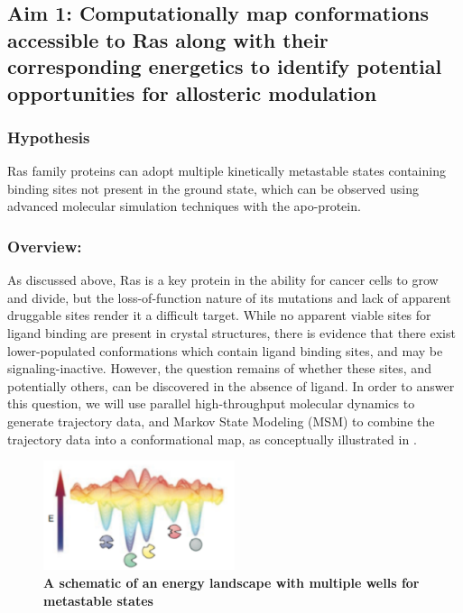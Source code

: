 \documentclass[12pt]{article}
\begin{document}
  \subsection*{Aim 1: Computationally map conformations accessible to Ras along with their corresponding energetics to identify potential opportunities for allosteric modulation}
  
  \subsubsection*{Hypothesis}
  Ras family proteins can adopt multiple kinetically metastable states containing binding sites not present in the ground state, which can be observed using advanced molecular simulation techniques with the apo-protein.
  \subsubsection*{Overview:}
  As discussed above, Ras is a key protein in the ability for cancer cells to grow and divide, but the loss-of-function nature of its mutations and lack of apparent druggable sites render it a difficult target. While no apparent viable sites for ligand binding are present in crystal structures, there is evidence that there exist lower-populated conformations \cite{fesik} \cite{ostrem2013} which contain ligand binding sites, and may be signaling-inactive. However, the question remains of whether these sites, and potentially others, can be discovered in the absence of ligand. In order to answer this question, we will use parallel high-throughput molecular dynamics to generate trajectory data, and Markov State Modeling (MSM) \cite{chodera2014} to combine the trajectory data into a conformational map, as conceptually illustrated in .
  
    \begin{figure}[H]
  \centering
  \includegraphics[width=0.5\textwidth]{craik.png}
  \caption{\textbf{A schematic of an energy landscape with multiple wells for metastable states} \cite{craik}}
  \label{craikfig}
  \end{figure}
  
\end{document}
